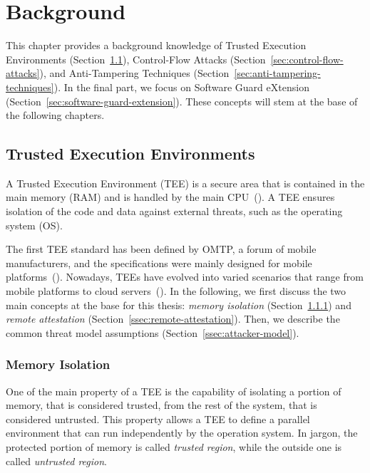 \chapter{Background}
\label{chp:background} 

This chapter provides a background knowledge of Trusted Execution Environments 
(Section~\ref{sec:trusted-execution-enviroments}), Control-Flow Attacks 
(Section~\ref{sec:control-flow-attacks}), and Anti-Tampering Techniques 
(Section~\ref{sec:anti-tampering-techniques}).
In the final part, we focus on Software Guard eXtension 
(Section~\ref{sec:software-guard-extension}).
These concepts will stem at the base of the following chapters.

\section{Trusted Execution Environments}
\label{sec:trusted-execution-enviroments}

A Trusted Execution Environment (TEE) is a secure area that is contained in the 
main memory (RAM) and is handled by the main CPU~(\cite{Sabt2015TrustedEE}).
A TEE ensures isolation of the code and data against external threats, such as 
the operating system (OS).

The first TEE standard has been defined by OMTP, a forum of mobile 
manufacturers, and the specifications were mainly designed for mobile 
platforms~(\cite{omtp}).
Nowadays, TEEs have evolved into varied scenarios that 
range from mobile platforms to cloud servers~(\cite{schuster2015vc3,sgxtor}).
In the following, we first discuss the two main concepts at the base for this 
thesis: \emph{memory isolation} (Section~\ref{ssec:memory-isolation}) and 
\emph{remote attestation} (Section~\ref{ssec:remote-attestation}).
Then, we describe the common threat model assumptions 
(Section~\ref{ssec:attacker-model}).

\subsection{Memory Isolation}
\label{ssec:memory-isolation}

One of the main property of a TEE is the capability of isolating a portion of 
memory, that is considered trusted, from the rest of the system, that  is 
considered untrusted.
This property allows a TEE to define a parallel environment that can run 
independently by the operation system.
In jargon, the protected portion of memory is called \emph{trusted 
region}, while the outside one is called \emph{untrusted region}.

